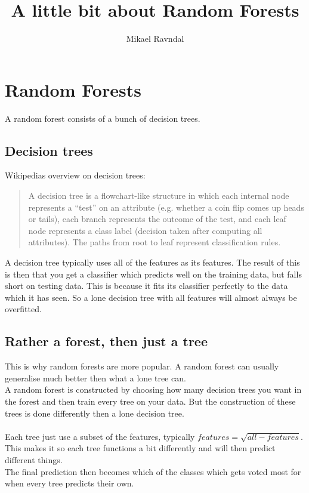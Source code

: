 \documentclass[a4paper,norsk]{article}
\title {A little bit about Random Forests}
\author {Mikael Ravndal}
\begin{document}
\maketitle
\section{Random Forests}
A random forest consists of a bunch of decision trees.

\subsection{Decision trees}
Wikipedias overview on decision trees:
 \begin{quotation}
  A decision tree is a flowchart-like structure in which each internal node represents a ``test'' on an attribute (e.g. whether a coin flip comes up heads or tails), each branch represents the outcome of the test, and each leaf node represents a class label (decision taken after computing all attributes). The paths from root to leaf represent classification rules.
 \end{quotation}
A decision tree typically uses all of the features as its features. The result of this is then that you get a classifier which predicts well on the training data, but falls short on testing data. This is because it fits its classifier perfectly to the data which it has seen. So a lone decision tree with all features will almost always be overfitted.
\subsection{Rather a forest, then just a tree}
This is why random forests are more popular. A random forest can usually generalise much better then what a lone tree can.\\
A random forest is constructed by choosing how many decision trees you want in the forest and then train every tree on your data. But the construction of these trees is done differently then a lone decision tree.\\
\\
Each tree just use a subset of the features, typically $ features = \sqrt{all-features}$. This makes it so each tree functions a bit differently and will then predict different things.\\
The final prediction then becomes which of the classes which gets voted most for when every tree predicts their own.
\end{document}

